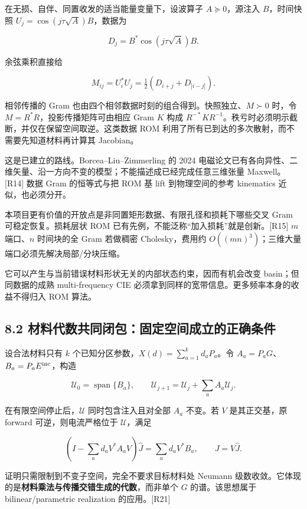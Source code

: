 \documentclass[11pt,a4paper]{article}
\begin{document}
在无损、自伴、同置收发的适当能量变量下，设波算子 \(A\succeq0\)，源注入
\(B\)，时间快照 \(U_j=\cos(j\tau\sqrt A)B\)，数据为

\[
D_j=B^*\cos(j\tau\sqrt A)B.
\]

余弦乘积直接给

\[
M_{ij}=U_i^*U_j
=\tfrac12(D_{i+j}+D_{|i-j|}).
\]

相邻传播的 Gram 也由四个相邻数据时刻的组合得到。快照独立、\(M\succ0\)
时，令 \(M=R^*R\)，投影传播矩阵可由相应 Gram \(K\) 构成
\(R^{-*}KR^{-1}\)。秩亏时必须明示截断，并仅在保留空间取逆。这类数据 ROM
利用了所有已到达的多次散射，而不需要先知道材料再计算其 Jacobian。

这是已建立的路线。Borcea--Liu--Zimmerling 的 2024
电磁论文已有各向异性、二维矢量、沿一方向不变的模型；不能描述成已经完成任意三维张量
Maxwell。{[}R14{]} 数据 Gram 的恒等式与把 ROM 基 lift 到物理空间的参考
kinematics 近似，也必须分开。

本项目更有价值的开放点是非同置矩形数据、有限孔径和损耗下哪些交叉 Gram
可稳定恢复。损耗层状 ROM
已有先例，不能泛称``加入损耗''就是创新。{[}R15{]} \(m\) 端口、\(n\)
时间块的全 Gram 若做稠密 Cholesky，费用约
\(O((mn)^3)\)；三维大量端口必须先解决局部/分块压缩。

它可以产生与当前错误材料形状无关的内部状态约束，因而有机会改变
basin；但同数据的成熟 multi-frequency CIE
必须拿到同样的宽带信息。更多频率本身的收益不得归入 ROM 算法。

\hypertarget{ux6750ux6599ux4ee3ux6570ux5171ux540cux95edux5305ux56faux5b9aux7a7aux95f4ux6210ux7acbux7684ux6b63ux786eux6761ux4ef6}{%
\subsection{8.2
材料代数共同闭包：固定空间成立的正确条件}\label{ux6750ux6599ux4ee3ux6570ux5171ux540cux95edux5305ux56faux5b9aux7a7aux95f4ux6210ux7acbux7684ux6b63ux786eux6761ux4ef6}}

设合法材料只有 \(k\) 个已知分区参数，\(X(d)=\sum_{a=1}^kd_aP_a\)。令
\(A_a=P_aG\)、\(B_a=P_aE^{\rm inc}\)，构造

\[
\mathcal U_0=\operatorname{span}\{B_a\},\qquad
\mathcal U_{j+1}=\mathcal U_j+\sum_aA_a\mathcal U_j.
\]

在有限空间停止后，\(\mathcal U\) 同时包含注入且对全部 \(A_a\) 不变。若
\(V\) 是其正交基，原 forward 可逆，则电流严格位于 \(\mathcal U\)，满足

\[
\left(I-\sum_ad_aV^*A_aV\right)\widehat J
=\sum_ad_aV^*B_a,\qquad J=V\widehat J.
\]

证明只需限制到不变子空间，完全不要求目标材料处 Neumann
级数收敛。它体现的是\textbf{材料乘法与传播交错生成的代数}，而非单个
\(G\) 的谱。该思想属于 bilinear/parametric realization 的应用。{[}R21{]}
\end{document}
